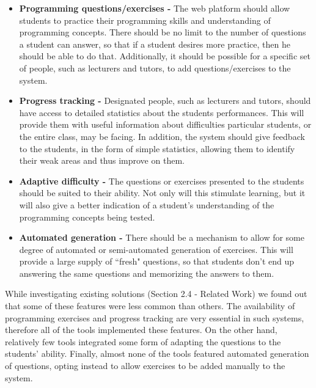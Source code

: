 \documentclass[11pt,a4paper]{report}
\begin{document}
\begin{itemize}
\item \textbf{Programming questions/exercises -} The web platform should allow students to practice their programming skills and understanding of programming concepts. There should be no limit to the number of questions a student can answer, so that if a student desires more practice, then he should be able to do that. Additionally, it should be possible for a specific set of people, such as lecturers and tutors, to add questions/exercises to the system.
\item \textbf{Progress tracking -} Designated people, such as lecturers and tutors, should have access to detailed statistics about the students performances. This will provide them with useful information about difficulties particular students, or the entire class, may be facing. In addition, the system should give feedback to the students, in the form of simple statistics, allowing them to identify their weak areas and thus improve on them.
\item \textbf{Adaptive difficulty -} The questions or exercises presented to the students should be suited to their ability. Not only will this stimulate learning, but it will also give a better indication of a student's understanding of the programming concepts being tested.
\item \textbf{Automated generation -} There should be a mechanism to allow for some degree of automated or semi-automated generation of exercises. This will provide a large supply of ``fresh" questions, so that students don't end up answering the same questions and memorizing the answers to them.
\end{itemize}

While investigating existing solutions (Section 2.4 - Related Work) we found out that some of these features were less common than others. The availability of programming exercises and progress tracking are very essential in such systems, therefore all of the tools implemented these features. On the other hand, relatively few tools integrated some form of adapting the questions to the students' ability. Finally, almost none of the tools featured automated generation of questions, opting instead to allow exercises to be added manually to the system.


\end{document}
